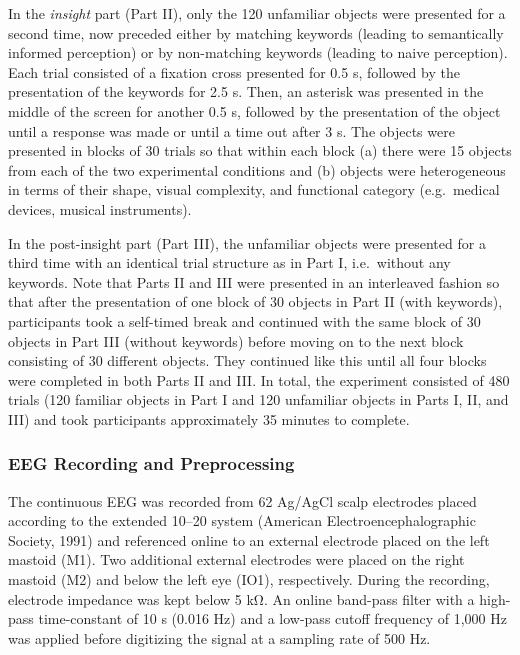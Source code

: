 \documentclass[
  english,
  man,11pt,floatsintext]{apa7}
\begin{document}
In the \emph{insight} part (Part II), only the 120 unfamiliar objects were presented for a second time, now preceded either by matching keywords (leading to semantically informed perception) or by non-matching keywords (leading to naive perception). Each trial consisted of a fixation cross presented for 0.5 s, followed by the presentation of the keywords for 2.5 s. Then, an asterisk was presented in the middle of the screen for another 0.5 s, followed by the presentation of the object until a response was made or until a time out after 3 s. The objects were presented in blocks of 30 trials so that within each block (a) there were 15 objects from each of the two experimental conditions and (b) objects were heterogeneous in terms of their shape, visual complexity, and functional category (e.g.~medical devices, musical instruments).

In the post-insight part (Part III), the unfamiliar objects were presented for a third time with an identical trial structure as in Part I, i.e.~without any keywords. Note that Parts II and III were presented in an interleaved fashion so that after the presentation of one block of 30 objects in Part II (with keywords), participants took a self-timed break and continued with the same block of 30 objects in Part III (without keywords) before moving on to the next block consisting of 30 different objects. They continued like this until all four blocks were completed in both Parts II and III. In total, the experiment consisted of 480 trials (120 familiar objects in Part I and 120 unfamiliar objects in Parts I, II, and III) and took participants approximately 35 minutes to complete.

\hypertarget{eeg-recording-and-preprocessing}{%
\subsubsection{EEG Recording and Preprocessing}\label{eeg-recording-and-preprocessing}}

The continuous EEG was recorded from 62 Ag/AgCl scalp electrodes placed according to the extended 10--20 system (American Electroencephalographic Society, 1991) and referenced online to an external electrode placed on the left mastoid (M1). Two additional external electrodes were placed on the right mastoid (M2) and below the left eye (IO1), respectively. During the recording, electrode impedance was kept below 5 kΩ. An online band-pass filter with a high-pass time-constant of 10 s (0.016 Hz) and a low-pass cutoff frequency of 1,000 Hz was applied before digitizing the signal at a sampling rate of 500 Hz.
\end{document}
